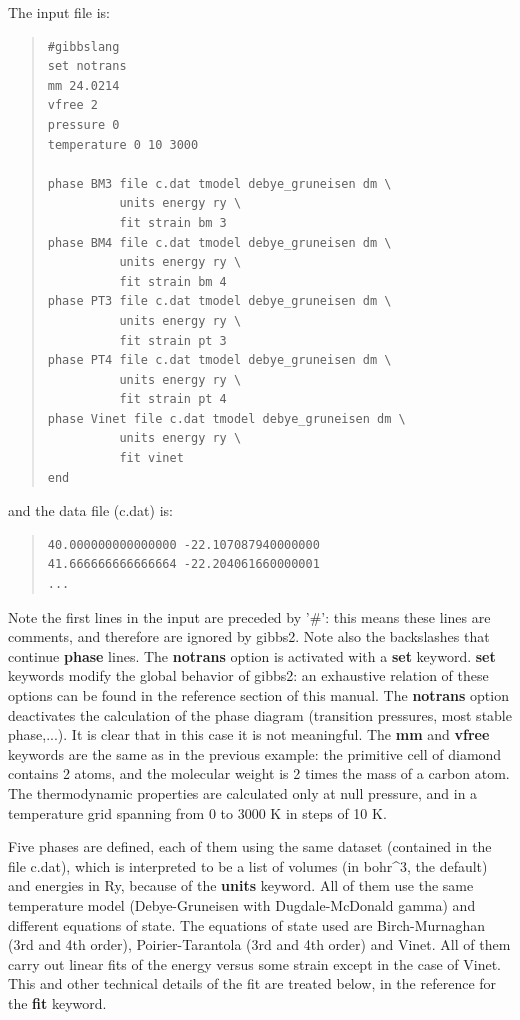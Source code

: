 \documentclass[a4paper]{article}
\begin{document}
The input file is:
%
\begin{quote}
\begin{verbatim}
#gibbslang
set notrans
mm 24.0214
vfree 2
pressure 0
temperature 0 10 3000

phase BM3 file c.dat tmodel debye_gruneisen dm \
          units energy ry \
          fit strain bm 3
phase BM4 file c.dat tmodel debye_gruneisen dm \
          units energy ry \
          fit strain bm 4
phase PT3 file c.dat tmodel debye_gruneisen dm \
          units energy ry \
          fit strain pt 3
phase PT4 file c.dat tmodel debye_gruneisen dm \
          units energy ry \
          fit strain pt 4
phase Vinet file c.dat tmodel debye_gruneisen dm \
          units energy ry \
          fit vinet
end
\end{verbatim}
\end{quote}

and the data file (c.dat) is:
%
\begin{quote}
\begin{verbatim}
40.000000000000000 -22.107087940000000
41.666666666666664 -22.204061660000001
...
\end{verbatim}
\end{quote}

Note the first lines in the input are preceded by '\#': this means
these lines are comments, and therefore are ignored by gibbs2. Note
also the backslashes that continue \textbf{phase} lines. The \textbf{notrans}
option is activated with a \textbf{set} keyword. \textbf{set} keywords modify
the global behavior of gibbs2: an exhaustive relation of these options
can be found in the reference section of this manual. The \textbf{notrans}
option deactivates the calculation of the phase diagram (transition
pressures, most stable phase,...). It is clear that in this case it is
not meaningful. The \textbf{mm} and \textbf{vfree} keywords are the same as in
the previous example: the primitive cell of diamond contains 2 atoms,
and the molecular weight is 2 times the mass of a carbon atom. The
thermodynamic properties are calculated only at null pressure, and in
a temperature grid spanning from 0 to 3000 K in steps of 10 K.

Five phases are defined, each of them using the same dataset
(contained in the file c.dat), which is interpreted to be a list of
volumes (in bohr\textasciicircum{}3, the default) and energies in Ry, because of the
\textbf{units} keyword. All of them use the same temperature model
(Debye-Gruneisen with Dugdale-McDonald gamma) and different equations
of state. The equations of state used are Birch-Murnaghan (3rd and 4th
order), Poirier-Tarantola (3rd and 4th order) and Vinet. All of them
carry out linear fits of the energy versus some strain except in the
case of Vinet. This and other technical details of the fit are treated
below, in the reference for the \textbf{fit} keyword.
\end{document}
